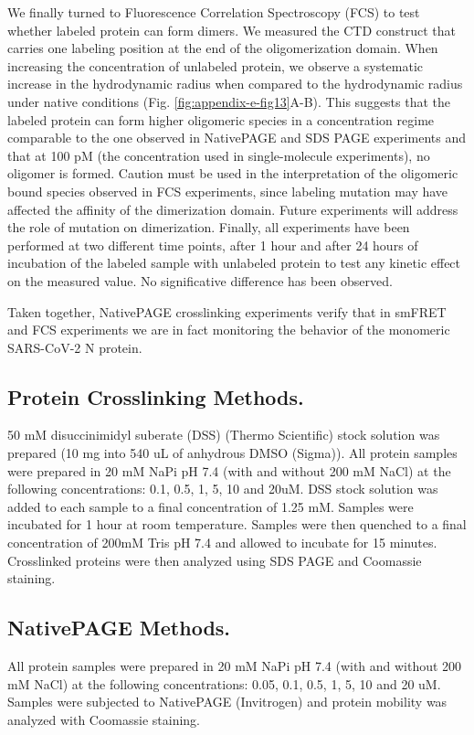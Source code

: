 \documentclass[../main.tex]{subfiles}
\begin{document}
        We finally turned to Fluorescence Correlation Spectroscopy (FCS) to test whether labeled protein can form dimers. We measured the CTD construct that carries one labeling position at the end of the oligomerization domain. When increasing the concentration of unlabeled protein, we observe a systematic increase in the hydrodynamic radius when compared to the hydrodynamic radius under native conditions (Fig. \ref{fig:appendix-e-fig13}A-B). This suggests that the labeled protein can form higher oligomeric species in a concentration regime comparable to the one observed in NativePAGE and SDS PAGE experiments and that at 100 pM (the concentration used in single-molecule experiments), no oligomer is formed. Caution must be used in the interpretation of the oligomeric bound species observed in FCS experiments, since labeling mutation may have affected the affinity of the dimerization domain. Future experiments will address the role of mutation on dimerization. Finally, all experiments have been performed at two different time points, after 1 hour and after 24 hours of incubation of the labeled sample with unlabeled protein to test any kinetic effect on the measured value. No significative difference has been observed.

        Taken together, NativePAGE crosslinking experiments verify that in smFRET and FCS experiments we are in fact monitoring the behavior of the monomeric SARS-CoV-2 N protein. 

    \subsection{Protein Crosslinking Methods.}
        50 mM disuccinimidyl suberate (DSS) (Thermo Scientific) stock solution was prepared (10 mg into 540 uL of anhydrous DMSO (Sigma)). All protein samples were prepared in 20 mM NaPi pH 7.4 (with and without 200 mM NaCl) at the following concentrations: 0.1, 0.5, 1, 5, 10 and 20uM. DSS stock solution was added to each sample to a final concentration of 1.25 mM. Samples were incubated for 1 hour at room temperature. Samples were then quenched to a final concentration of 200mM Tris pH 7.4 and allowed to incubate for 15 minutes. Crosslinked proteins were then analyzed using SDS PAGE and Coomassie staining. 

    \subsection{NativePAGE Methods.} 
        All protein samples were prepared in 20 mM NaPi pH 7.4 (with and without 200 mM NaCl) at the following concentrations: 0.05, 0.1, 0.5, 1, 5, 10 and 20 uM. Samples were subjected to NativePAGE (Invitrogen) and protein mobility was analyzed with Coomassie staining.
\end{document}
